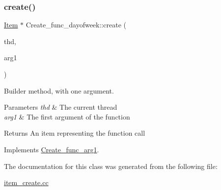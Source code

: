 \subsubsection{\texorpdfstring{create()}{create()}}
{\footnotesize\ttfamily \mbox{\hyperlink{classItem}{Item}} $\ast$ Create\+\_\+func\+\_\+dayofweek\+::create (\begin{DoxyParamCaption}\item[{T\+HD $\ast$}]{thd,  }\item[{\mbox{\hyperlink{classItem}{Item}} $\ast$}]{arg1 }\end{DoxyParamCaption})\hspace{0.3cm}{\ttfamily [virtual]}}

Builder method, with one argument. 
\begin{DoxyParams}{Parameters}
{\em thd} & The current thread \\
\hline
{\em arg1} & The first argument of the function \\
\hline
\end{DoxyParams}
\begin{DoxyReturn}{Returns}
An item representing the function call 
\end{DoxyReturn}


Implements \mbox{\hyperlink{classCreate__func__arg1_a3e9a98f755cd82c3e762e334c955a8c9}{Create\+\_\+func\+\_\+arg1}}.



The documentation for this class was generated from the following file\+:\begin{DoxyCompactItemize}
\item 
\mbox{\hyperlink{item__create_8cc}{item\+\_\+create.\+cc}}\end{DoxyCompactItemize}
